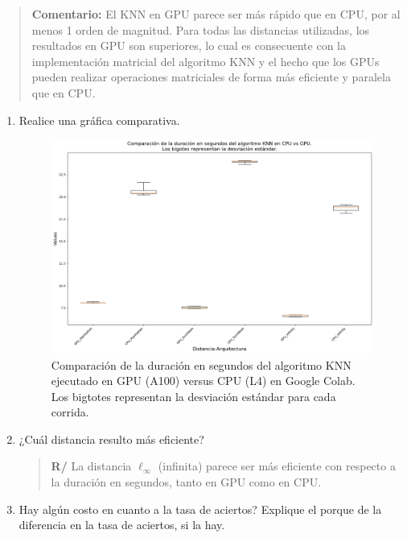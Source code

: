 \documentclass{article}
\begin{document}
\begin{enumerate}
\begin{enumerate}
\begin{enumerate}
\begin{quote}
    \textbf{Comentario:} El KNN en GPU parece ser más rápido que en CPU, por al menos 1 orden de magnitud. Para todas las distancias utilizadas, los resultados en GPU son superiores, lo cual es consecuente con la implementación matricial del algoritmo KNN y  el hecho que los GPUs pueden realizar operaciones matriciales de forma más eficiente y paralela que en CPU.
\end{quote}
\newpage
\begin{enumerate}
\item Realice una gráfica comparativa.

\begin{figure}
    
    \includegraphics[width=1.1\linewidth]{img/knn_cpu_vs_gpu_segundos.png}
    \caption{Comparación de la duración en segundos del algoritmo KNN ejecutado en GPU (A100) versus CPU (L4) en Google Colab. Los bigtotes representan la desviación estándar para cada corrida.}
    \label{fig:enter-label}
\end{figure}

\item ¿Cuál distancia resulto más eficiente? 

\begin{quote}
    \textbf{R/} La distancia $\ell_{\infty}$ (infinita) parece ser más eficiente con respecto a la duración en segundos, tanto en GPU como en CPU.
\end{quote}

\item Hay algún costo en cuanto a la tasa de aciertos? Explique el porque de la diferencia en la tasa de aciertos, si la hay. 


\end{enumerate}
\end{enumerate}
\end{enumerate}
\end{enumerate}
\end{document}
